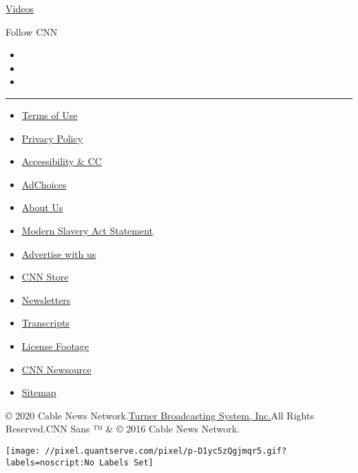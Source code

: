 \href{/videos}{Videos}

Follow CNN

\begin{itemize}
\item
\item
\item
\end{itemize}

\begin{center}\rule{0.5\linewidth}{\linethickness}\end{center}

\begin{itemize}
\tightlist
\item
  \href{/terms}{Terms of Use}
\item
  \href{/privacy}{Privacy Policy}
\item
  \href{/accessibility}{Accessibility \& CC}
\item
  \protect\hyperlink{}{AdChoices}
\item
  \href{/about}{About Us}
\item
  \href{/msa}{Modern Slavery Act Statement}
\item
  \href{https://commercial.cnn.com}{Advertise with us}
\item
  \href{//store.cnn.com}{CNN Store}
\item
  \href{/newsletters}{Newsletters}
\item
  \href{/transcripts}{Transcripts}
\item
  \href{/collection}{License Footage}
\item
  \href{http://cnnnewsource.com}{CNN Newsource}
\item
  \href{https://www.cnn.com/sitemap.html}{Sitemap}
\end{itemize}

© 2020 Cable News Network.\href{//www.turner.com}{Turner Broadcasting
System, Inc.}All Rights Reserved.CNN Sans ™ \& © 2016 Cable News
Network.

\texttt{[image: //pixel.quantserve.com/pixel/p-D1yc5zQgjmqr5.gif?labels=noscript:No Labels Set]}
